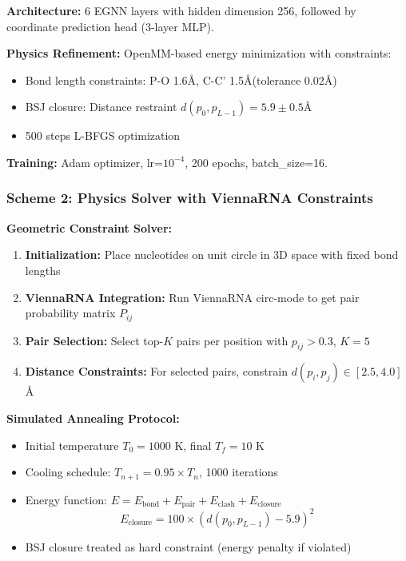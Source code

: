 \documentclass[12pt]{article}
\begin{document}
\textbf{Architecture:} 6 EGNN layers with hidden dimension 256, followed by coordinate prediction head (3-layer MLP).

\textbf{Physics Refinement:} OpenMM-based energy minimization with constraints:
\begin{itemize}
\item Bond length constraints: P-O 1.6\AA, C-C' 1.5\AA (tolerance 0.02\AA)
\item BSJ closure: Distance restraint $d(p_0, p_{L-1}) = 5.9 \pm 0.5$\AA
\item 500 steps L-BFGS optimization
\end{itemize}

\textbf{Training:} Adam optimizer, lr=$10^{-4}$, 200 epochs, batch\_size=16.

\subsubsection{Scheme 2: Physics Solver with ViennaRNA Constraints}

\textbf{Geometric Constraint Solver:}
\begin{enumerate}
\item \textbf{Initialization:} Place nucleotides on unit circle in 3D space with fixed bond lengths
\item \textbf{ViennaRNA Integration:} Run ViennaRNA circ-mode to get pair probability matrix $P_{ij}$
\item \textbf{Pair Selection:} Select top-$K$ pairs per position with $p_{ij} > 0.3$, $K=5$
\item \textbf{Distance Constraints:} For selected pairs, constrain $d(p_i, p_j) \in [2.5, 4.0]$Å
\end{enumerate}

\textbf{Simulated Annealing Protocol:}
\begin{itemize}
\item Initial temperature $T_0 = 1000$ K, final $T_f = 10$ K
\item Cooling schedule: $T_{n+1} = 0.95 \times T_n$, 1000 iterations
\item Energy function: $E = E_{\text{bond}} + E_{\text{pair}} + E_{\text{clash}} + E_{\text{closure}}$
\begin{equation}
E_{\text{closure}} = 100 \times (d(p_0, p_{L-1}) - 5.9)^2
\end{equation}
\item BSJ closure treated as hard constraint (energy penalty if violated)
\end{itemize}
\end{document}
